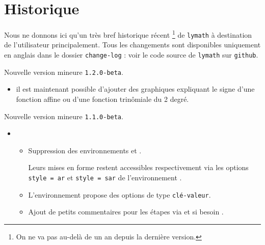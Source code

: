 \documentclass[12pt,a4paper]{article}
\begin{document}
\newpage

\section{Historique}

Nous ne donnons ici qu'un très bref historique récent
\footnote{
	On ne va pas au-delà de un an depuis la dernière version.
}
de \verb+lymath+ à destination de l'utilisateur principalement.
Tous les changements sont disponibles uniquement en anglais dans le dossier \verb+change-log+ : voir le code source de \verb+lymath+ sur \verb+github+.

\begin{description}

    \medskip
    \item[2020-07-05] Nouvelle version mineure \verb+1.2.0-beta+.
    
    \begin{itemize}[itemsep=.5em]
        \item {}
              il est maintenant possible d'ajouter des graphiques expliquant le signe d'une fonction affine ou d'une fonction trinômiale du 2\ieme{} degré.
    \end{itemize}

    \medskip
    \item[2020-06-27] Nouvelle version mineure \verb+1.1.0-beta+.
    
    \begin{itemize}[itemsep=.5em]
        \item {}
        \begin{itemize}[itemsep=.5em]
            \item Suppression des environnements  et .
    
                  \smallskip
    
                  Leurs mises en forme restent accessibles respectivement via les options \verb+style = ar+ et \verb+style = sar+ de l'environnement .
    
    
            \item L'environnement  propose des options de type \texttt{clé-valeur}.
    
    
            \item Ajout de petits commentaires pour les étapes via  et si besoin .
    

\end{itemize}
\end{itemize}
\end{description}
\end{document}
